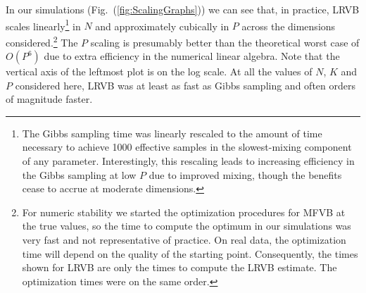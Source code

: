 \documentclass{article}\usepackage[]{graphicx}\usepackage[]{color}
\newcommand{\fig}[1]{Fig.~(\ref{fig:#1})}
\begin{document}
In our simulations (\fig{ScalingGraphs}) we can see that,
in practice, LRVB scales linearly\footnote{The Gibbs sampling time was linearly rescaled to the amount
of time necessary to achieve 1000 effective samples in the slowest-mixing
component of any parameter.  Interestingly, this rescaling
leads to increasing efficiency in the Gibbs sampling at low $P$ due
to improved mixing, though the benefits cease to accrue at moderate dimensions.}
 in $N$
and approximately cubically in $P$ across the dimensions considered.\footnote{For numeric stability
we started the optimization procedures for MFVB at the true
values, so the time to compute the optimum in our simulations
was very fast and not representative of practice.
On real data, the optimization time will depend on the
quality of the starting point.
Consequently, the times shown for LRVB are only the
times to compute the LRVB estimate.  The optimization times were
on the same order.}
The $P$ scaling is presumably better than the theoretical worst
case of $O(P^6)$ due to extra efficiency in the numerical linear algebra.
%
Note that the vertical axis of the leftmost plot is on the log scale.
At all the values of $N$, $K$ and $P$
considered here, LRVB was at least as fast as Gibbs sampling and
often orders of magnitude faster.
%
\end{document}
